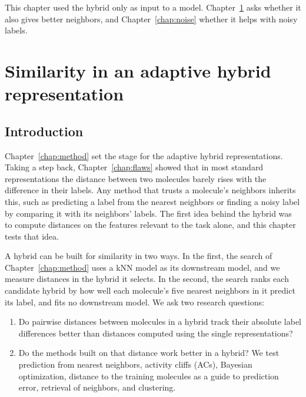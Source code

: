 This chapter used the hybrid only as input to a model. Chapter~\ref{chap:similarity} asks whether it also gives better neighbors, and Chapter~\ref{chap:noise} whether it helps with noisy labels.

\chapter{Similarity in an adaptive hybrid representation}\label{chap:similarity}

\section{Introduction}

Chapter~\ref{chap:method} set the stage for the adaptive hybrid representations. Taking a step back, Chapter~\ref{chap:flaws} showed that in most standard representations the distance between two molecules barely rises with the difference in their labels. Any method that trusts a molecule's neighbors inherits this, such as predicting a label from the nearest neighbors or finding a noisy label by comparing it with its neighbors' labels. The first idea behind the hybrid was to compute distances on the features relevant to the task alone, and this chapter tests that idea.

A hybrid can be built for similarity in two ways. In the first, the search of Chapter~\ref{chap:method} uses a kNN model as its downstream model, and we measure distances in the hybrid it selects. In the second, the search ranks each candidate hybrid by how well each molecule's five nearest neighbors in it predict its label, and fits no downstream model. We ask two research questions:
\begin{enumerate}
    \item Do pairwise distances between molecules in a hybrid track their absolute label differences better than distances computed using the single representations?
    \item Do the methods built on that distance work better in a hybrid? We test prediction from nearest neighbors, activity cliffs (ACs), Bayesian optimization, distance to the training molecules as a guide to prediction error, retrieval of neighbors, and clustering.
\end{enumerate}

